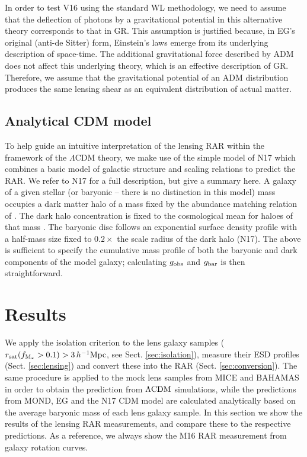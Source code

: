 \documentclass[usenatbib]{mnras}
\newcommand{\hMpc}{\, h^{-1}{\rm{Mpc}} }
\newcommand{\lcdm}{{\rm \Lambda CDM}}
\newcommand{\un}[1]{_{\rm #1}}
\begin{document}
In order to test V16 using the standard WL methodology, we need to assume that the deflection of photons by a gravitational potential in this alternative theory corresponds to that in GR. This assumption is justified because, in EG's original (anti-de Sitter) form, Einstein's laws emerge from its underlying description of space-time. The additional gravitational force described by ADM does not affect this underlying theory, which is an effective description of GR. Therefore, we assume that the gravitational potential of an ADM distribution produces the same lensing shear as an equivalent distribution of actual matter.

\subsection{Analytical CDM model}
\label{sec:analytical}

To help guide an intuitive interpretation of the lensing RAR within the framework of the $\Lambda$CDM theory, we make use of the simple model of N17 which combines a basic model of galactic structure and scaling relations to predict the RAR. We refer to N17 for a full description, but give a summary here. A galaxy of a given stellar (or baryonic -- there is no distinction in this model)  mass occupies a dark matter halo of a mass fixed by the abundance matching relation of \citet{Behroozi13}. The dark halo concentration is fixed to the cosmological mean for haloes of that mass \citep{Ludlow14}. The baryonic disc follows an exponential surface density profile with a half-mass size fixed to $0.2\times$ the scale radius of the dark halo (N17). The above is sufficient to specify the cumulative mass profile of both the baryonic and dark components of the model galaxy; calculating $g_{\rm obs}$ and $g_{\rm bar}$ is then straightforward.

\section{Results}
\label{sec:results}

We apply the isolation criterion to the lens galaxy samples (\mbox{$r\un{sat}(f\un{M_*}>0.1)>3\hMpc$}, see Sect. \ref{sec:isolation}), measure their ESD profiles (Sect. \ref{sec:lensing}) and convert these into the RAR (Sect. \ref{sec:conversion}). The same procedure is applied to the mock lens samples from MICE and BAHAMAS in order to obtain the prediction from $\lcdm$ simulations, while the predictions from MOND, EG and the N17 CDM model are calculated analytically based on the average baryonic mass of each lens galaxy sample. In this section we show the results of the lensing RAR measurements, and compare these to the respective predictions. As a reference, we always show the M16 RAR measurement from galaxy rotation curves.
\end{document}

